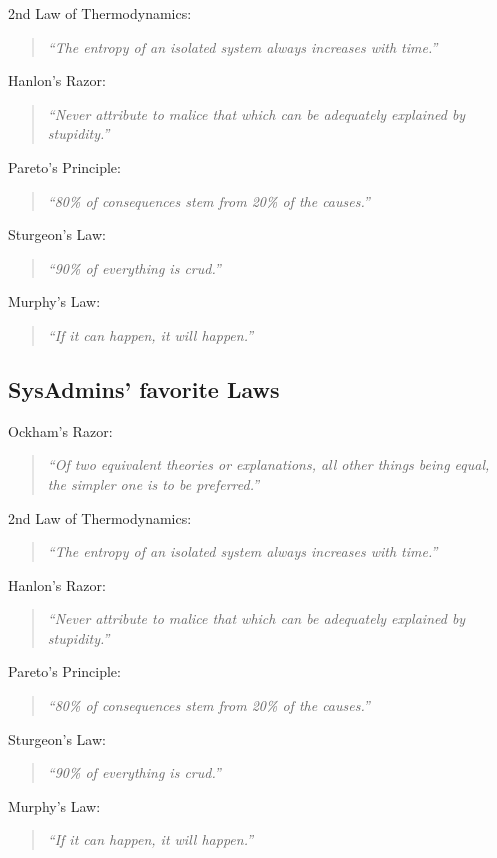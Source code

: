 \documentclass[xga]{xdvislides}
\newcommand{\smallish}{\fontsize{18}{18}\selectfont}
\begin{document}
2nd Law of Thermodynamics:
\begin{quote}
{\em ``The entropy of an isolated system always increases with time.''}
\end{quote}

Hanlon's Razor:
\begin{quote}
{\em ``Never attribute to malice that which can be adequately explained by
stupidity.''}
\end{quote}

Pareto's Principle:
\begin{quote}
{\em ``80\% of consequences stem from 20\% of the causes.''}
\end{quote}

Sturgeon's Law:
\begin{quote}
{\em ``90\% of everything is crud.''}
\end{quote}

Murphy's Law:
\begin{quote}
{\em ``If it can happen, it will happen.''}
\end{quote}
\Normalsize


\subsection{SysAdmins' favorite Laws}
\smallish
Ockham's Razor:
\begin{quote}
{\em ``Of two equivalent theories or explanations, all other things being
equal, the simpler one is to be preferred.''}
\end{quote}

2nd Law of Thermodynamics:
\begin{quote}
{\em ``The entropy of an isolated system always increases with time.''}
\end{quote}

Hanlon's Razor:
\begin{quote}
{\em ``Never attribute to malice that which can be adequately explained by
stupidity.''}
\end{quote}

Pareto's Principle:
\begin{quote}
{\em ``80\% of consequences stem from 20\% of the causes.''}
\end{quote}

Sturgeon's Law:
\begin{quote}
{\em ``90\% of everything is crud.''}
\end{quote}

Murphy's Law:
\begin{quote}
{\em ``If it can happen, it will happen.''}
\end{quote}
\end{document}
